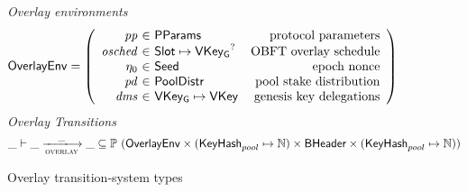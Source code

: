 \begin{figure}
  \emph{Overlay environments}
  \begin{equation*}
    \OverlayEnv =
    \left(
      \begin{array}{r@{~\in~}lr}
        \var{pp} & \PParams & \text{protocol parameters} \\
        \var{osched} & \Slot\mapsto\VKeyGen^? & \text{OBFT overlay schedule} \\
        \eta_0 & \Seed & \text{epoch nonce} \\
        \var{pd} & \PoolDistr & \text{pool stake distribution} \\
        \var{dms} & \VKeyGen\mapsto\VKey & \text{genesis key delegations} \\
      \end{array}
    \right)
  \end{equation*}
  \emph{Overlay Transitions}
  \begin{equation*}
    \_ \vdash \var{\_} \trans{overlay}{\_} \var{\_} \subseteq
    \powerset (\OverlayEnv \times (\KeyHash_{pool} \mapsto \N) \times \BHeader \times
    (\KeyHash_{pool} \mapsto \N))
  \end{equation*}
  \caption{Overlay transition-system types}
  \label{fig:ts-types:overlay}
\end{figure}

